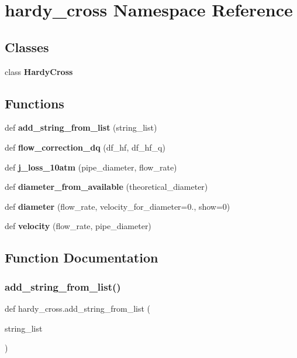 \section{hardy\+\_\+cross Namespace Reference}
\label{namespacehardy__cross}
\subsection*{Classes}
\begin{DoxyCompactItemize}
\item 
class \textbf{ Hardy\+Cross}
\end{DoxyCompactItemize}
\subsection*{Functions}
\begin{DoxyCompactItemize}
\item 
def \textbf{ add\+\_\+string\+\_\+from\+\_\+list} (string\+\_\+list)
\item 
def \textbf{ flow\+\_\+correction\+\_\+dq} (df\+\_\+hf, df\+\_\+hf\+\_\+q)
\item 
def \textbf{ j\+\_\+loss\+\_\+10atm} (pipe\+\_\+diameter, flow\+\_\+rate)
\item 
def \textbf{ diameter\+\_\+from\+\_\+available} (theoretical\+\_\+diameter)
\item 
def \textbf{ diameter} (flow\+\_\+rate, velocity\+\_\+for\+\_\+diameter=0., show=0)
\item 
def \textbf{ velocity} (flow\+\_\+rate, pipe\+\_\+diameter)
\end{DoxyCompactItemize}


\subsection{Function Documentation}
\mbox{\label{namespacehardy__cross_af67df6b942deb06c74e8609dc5c32143}} 
\subsubsection{add\+\_\+string\+\_\+from\+\_\+list()}
{\footnotesize\ttfamily def hardy\+\_\+cross.\+add\+\_\+string\+\_\+from\+\_\+list (\begin{DoxyParamCaption}\item[{}]{string\+\_\+list }\end{DoxyParamCaption})}

